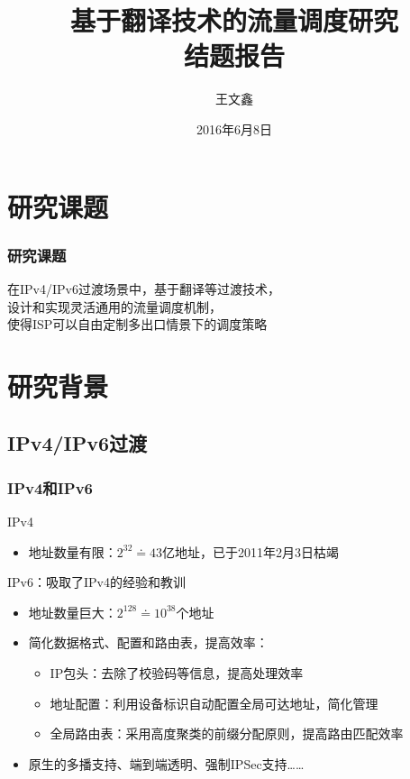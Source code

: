 \documentclass{beamer}
\title{
  基于翻译技术的流量调度研究 \\
  结题报告
}
\author{王文鑫}
\date{2016年6月8日}
\begin{document}
\begin{frame}
  \titlepage
\end{frame}

\section{研究课题}

\begin{frame}
  \frametitle{研究课题}

  在IPv4/IPv6过渡场景中，基于翻译等过渡技术，\\设计和实现灵活通用的流量调度机制，\\
  使得ISP可以自由定制多出口情景下的调度策略
\end{frame}

\section{研究背景}
\subsection{IPv4/IPv6过渡}
\begin{frame}
  \frametitle{IPv4和IPv6}

  \begin{block}{IPv4}
    \begin{itemize}
    \item 地址数量有限：$2^{32} \doteq 43$亿地址，已于2011年2月3日枯竭\footnotemark[1]
    \end{itemize}
  \end{block}

  \begin{block}{IPv6：吸取了IPv4的经验和教训}
    \begin{itemize}
    \item 地址数量巨大：$2^{128} \doteq 10^{38}$个地址
    \item 简化数据格式、配置和路由表，提高效率：
      \begin{itemize}
      \item IP包头：去除了校验码等信息，提高处理效率
      \item 地址配置：利用设备标识自动配置全局可达地址，简化管理
      \item 全局路由表：采用高度聚类的前缀分配原则，提高路由匹配效率
      \end{itemize}
    \item 原生的多播支持、端到端透明、强制IPSec支持……
    \end{itemize}
  \end{block}
\end{frame}
\end{document}
